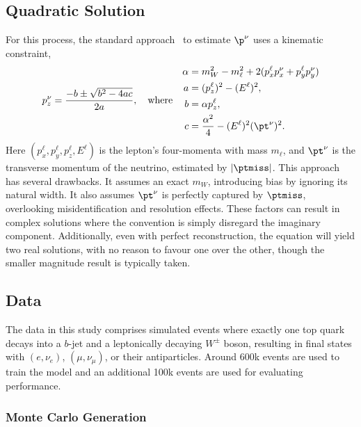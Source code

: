 \subsection{Quadratic Solution}

For this process, the standard approach~\cite{Quad1, Quad2, Quad4, Quad5} to estimate $\p^\nu$ uses a kinematic constraint,
\begin{equation}
    \label{eq:quadratic}
    p_z^\nu = \frac{-b \pm \sqrt{b^2-4ac}}{2a}, \quad \text{where} \quad
    \begin{aligned}
        \alpha & = m_W^2 - m_\ell^2+2(p_x^\ell p_x^\nu+p_y^\ell p_y^\nu) \\
        a      & = (p_z^\ell)^2 - (E^\ell)^2,                            \\
        b      & = \alpha p_z^\ell,                                      \\
        c      & = \frac{\alpha^2}{4}-(E^\ell)^2(\pt^\nu)^2.
    \end{aligned}
\end{equation}
Here $(p_x^\ell, p_y^\ell, p_z^\ell, E^\ell)$ is the lepton's four-momenta with mass $m_\ell$, and $\pt^\nu$ is the transverse momentum of the neutrino, estimated by $|\ptmiss|$.
This approach has several drawbacks.
It assumes an exact $m_W$, introducing bias by ignoring its natural width.
It also assumes $\pt^\nu$ is perfectly captured by $\ptmiss$, overlooking misidentification and resolution effects.
These factors can result in complex solutions where the convention is simply disregard the imaginary component.
Additionally, even with perfect reconstruction, the equation will yield two real solutions, with no reason to favour one over the other, though the smaller magnitude result is typically taken.

\subsection{Data}
\label{sec:nu_data}

The data in this study comprises simulated \ttbar events where exactly one top quark decays into a $b$-jet and a leptonically decaying $W^\pm$ boson, resulting in final states with $(e,\nu_e)$, $(\mu,\nu_\mu)$, or their antiparticles.
Around 600k events are used to train the model and an additional 100k events are used for evaluating performance.

\subsubsection{Monte Carlo Generation}


